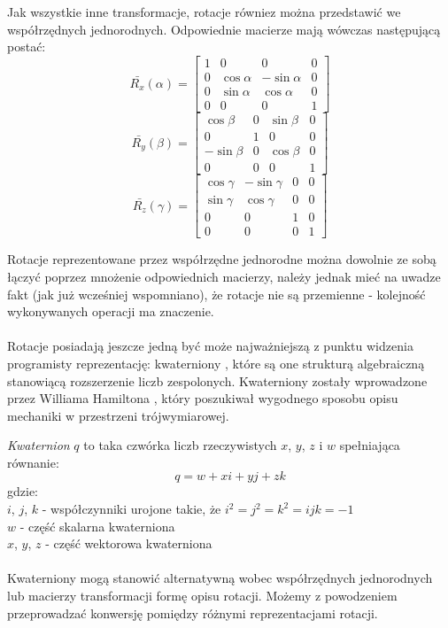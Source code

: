 \documentclass[licencjacka]{pracamgr}
\begin{document}
\\
\\
Jak wszystkie inne transformacje, rotacje równiez można przedstawić we współrzędnych jednorodnych. Odpowiednie macierze mają wówczas następującą postać:
$$
\bar{R_x}(\alpha) = 
\begin{bmatrix}
1 & 0 & 0 & 0 \\
0 & \cos{\alpha} & -\sin{\alpha} & 0 \\
0 & \sin{\alpha} & \cos{\alpha} & 0 \\
0 & 0 & 0 & 1
\end{bmatrix}
$$
$$
\bar{R_y}(\beta) = 
\begin{bmatrix}
\cos{\beta} & 0 & \sin{\beta} & 0 \\
0 & 1 & 0 & 0 \\
-\sin{\beta} & 0 & \cos{\beta} & 0 \\
0 & 0 & 0 & 1
\end{bmatrix}
$$
$$
\bar{R_z}(\gamma) = 
\begin{bmatrix}
\cos{\gamma} & -\sin{\gamma} & 0 & 0 \\
\sin{\gamma} & \cos{\gamma} & 0 & 0 \\
0 & 0 & 1 & 0 \\
0 & 0 & 0 & 1
\end{bmatrix}
$$

Rotacje reprezentowane przez współrzędne jednorodne można dowolnie ze sobą łączyć poprzez mnożenie odpowiednich macierzy, należy jednak mieć na uwadze fakt (jak już wcześniej wspomniano), że rotacje nie są przemienne - kolejność wykonywanych operacji ma znaczenie.
\\
\\
Rotacje posiadają jeszcze jedną być może najważniejszą z punktu widzenia programisty reprezentację: kwaterniony \cite{magarshak1992}, które są one strukturą algebraiczną stanowiącą rozszerzenie liczb zespolonych. Kwaterniony zostały wprowadzone przez Williama Hamiltona \cite{hamilton1843}, który poszukiwał wygodnego sposobu opisu mechaniki w przestrzeni trójwymiarowej. 

\textit{Kwaternion} $q$ to taka czwórka liczb rzeczywistych $x$, $y$, $z$ i $w$ spełniająca równanie:
$$
q=w+xi+yj+zk
$$
gdzie:
\\
$i$, $j$, $k$ - współczynniki urojone takie, że $i^2=j^2=k^2=ijk=-1$
\\
$w$ - część skalarna kwaterniona
\\
$x$, $y$, $z$ - część wektorowa kwaterniona
\\
\\
Kwaterniony mogą stanowić alternatywną wobec współrzędnych jednorodnych lub macierzy transformacji formę opisu rotacji. Możemy z powodzeniem przeprowadzać konwersję pomiędzy różnymi reprezentacjami rotacji.
\end{document}
